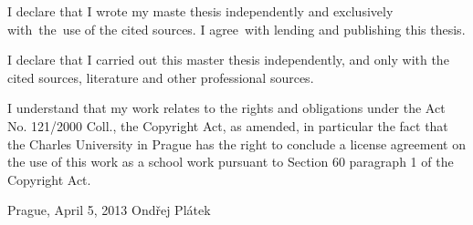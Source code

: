 \vspace{\fill} %
\noindent
I declare that I wrote my maste thesis independently and exclusively with~the~use of the cited sources. I agree~with lending and publishing this thesis.


\medskip\noindent
I declare that I carried out this master thesis independently, and only with the cited
sources, literature and other professional sources.

I understand that my work relates to the rights and obligations under the Act No.
121/2000 Coll., the Copyright Act, as amended, in particular the fact that the Charles
University in Prague has the right to conclude a license agreement on the use of this
work as a school work pursuant to Section 60 paragraph 1 of the Copyright Act.

\noindent Prague, April 5, 2013 \hspace{\fill}Ondřej Plátek 


%

\newpage

